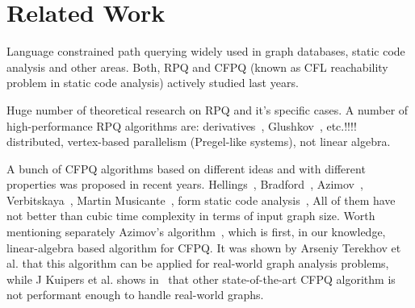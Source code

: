 \section{Related Work}

Language constrained path querying widely used in graph databases, static code analysis and other areas.
Both, RPQ and CFPQ (known as CFL reachability problem in static code analysis) actively studied last years.

Huge number of theoretical research on RPQ and it's specific cases.
A number of high-performance RPQ algorithms are: derivatives~\cite{10.1145/2949689.2949711}, Glushkov~\cite{Wang2019}, etc.!!!!~\cite{!!!} distributed, vertex-based parallelism (Pregel-like systems), not linear algebra.

A bunch of CFPQ algorithms based on different ideas and with different properties was proposed in recent years.
Hellings~\cite{hellingsRelational}, Bradford~\cite{8249039}, Azimov~\cite{Azimov:2018:CPQ:3210259.3210264}, Verbitskaya~\cite{10.1007/978-3-319-41579-6_22}, Martin Musicante~\cite{10.1007/978-3-319-91662-0_17,Medeiros:2018:EEC:3167132.3167265}, form static code analysis~\cite{!!!}, 
All of them have not better than cubic time complexity in terms of input graph size. 
Worth mentioning separately Azimov's algorithm~\cite{!!!}, which is first, in our knowledge, linear-algebra based algorithm for CFPQ. 
It was shown by Arseniy Terekhov et al.\cite{!!!} that this algorithm can be applied for real-world graph analysis problems, while J Kuipers et al. shows in~\cite{!!!} that other state-of-the-art CFPQ algorithm is not performant enough to handle real-world graphs.

